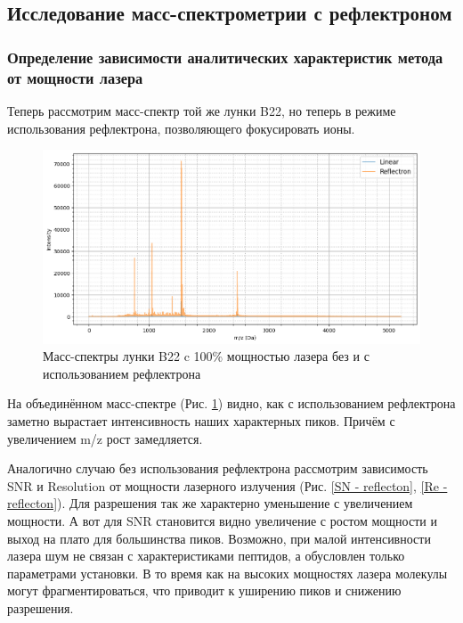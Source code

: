 \documentclass{article}
\begin{document}
\subsection{Исследование масс-спектрометрии с рефлектроном}
\subsubsection{Определение зависимости аналитических характеристик метода от мощности лазера}\;

\par Теперь рассмотрим масс-спектр той же лунки B22, но теперь в режиме использования рефлектрона, позволяющего фокусировать ионы.
\begin{figure}[h!]
\centering
    \includegraphics[width=1\linewidth]{Images/linear vs reflectron.png}
    \caption{Масс-спектры лунки B22 c 100\% мощностью лазера без и с использованием рефлектрона}
    \label{lin vs ref}
\end{figure}
\par На объединённом масс-спектре (Рис. \ref{lin vs ref}) видно, как с использованием рефлектрона заметно вырастает интенсивность наших характерных пиков. Причём с увеличением m/z рост замедляется.
\par Аналогично случаю без использования рефлектрона рассмотрим зависимость SNR и Resolution от мощности лазерного излучения (Рис. \ref{SN - reflecton}, \ref{Re - reflecton}). Для разрешения так же характерно уменьшение с увеличением мощности. А вот для SNR становится видно увеличение с ростом мощности и выход на плато для большинства пиков. Возможно, при малой интенсивности лазера шум не связан с характеристиками пептидов, а обусловлен только параметрами установки. В то время как на высоких мощностях лазера молекулы могут фрагментироваться, что приводит к уширению пиков и снижению разрешения.
\end{document}
